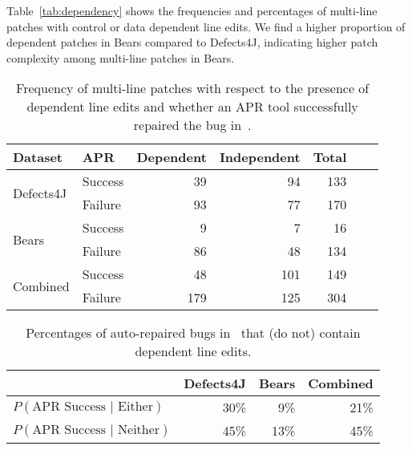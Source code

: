\documentclass[sigconf, timestamp-false, anonymous=true]{acmart}
\begin{document}
Table~\ref{tab:dependency} shows the 
frequencies and percentages of multi-line patches with control or data dependent 
line edits. We find a higher proportion of dependent patches in Bears compared to 
Defects4J, indicating higher patch complexity among multi-line patches in Bears.


\begin{table}
{\begin{center}
	\begin{tabular}{l | l | r r r r | r}
		\toprule
		Dataset & APR & Dependent & Independent & Total \\
		\midrule
		\multirow{2}{*}{Defects4J} & Success & 39 & 94 & 133 \\
		                                          & Failure   & 93 & 77 & 170 \\
		\midrule
		\multirow{2}{*}{Bears}       & Success &   9 &   7 &   16 \\
		                                          & Failure   & 86 & 48 & 134 \\
		\midrule
		\multirow{2}{*}{Combined}& Success & 48 &101& 149 \\
		                                          & Failure   &179&125& 304 \\
	\end{tabular}
 \end{center}
}
	\caption{Frequency of multi-line patches with respect to the presence of 
	dependent line edits and whether an APR tool successfully 
	repaired the bug in~\cite{durieux-repair-them-all}.}
	\label{tab:dependency-repair-contingency-table}
\end{table}

\begin{table}
{\begin{center}
	\begin{tabular}{l | rrr}
            	\toprule
		& Defects4J & Bears & Combined \\
		\midrule
		$P(\mbox{APR Success } | \mbox{ Either})$ & 30\% & 9\% & 21\% \\
		$P(\mbox{APR Success } | \mbox{ Neither})$ & 45\% & 13\% & 45\% \\
		\bottomrule
	\end{tabular}
 \end{center}
}
	\caption{Percentages of auto-repaired bugs in~\cite{durieux-repair-them-all} 
	that (do not) contain dependent line edits.}
	\label{tab:dependency-repair-percents}
\end{table}
\end{document}
